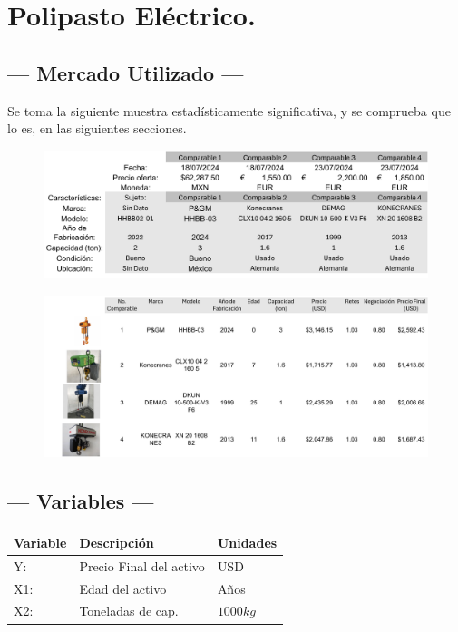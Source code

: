 
\section{Polipasto Eléctrico.} %

\subsection{\centering --- Mercado Utilizado ---} %
Se toma la siguiente muestra estadísticamente significativa, y se 
comprueba que lo es, en las siguientes secciones.
\begin{figure}[hbtp!]
	\centering
\includegraphics[width=  0.7\linewidth, page = 1]{../0.imagenes/CAP_8/mercado_2_1}
\end{figure}
\begin{figure}[hbtp!]
	\centering
\includegraphics[width=  \linewidth, page = 1]{../0.imagenes/CAP_8/mercado_2_2}
\end{figure}

\subsection{\centering --- Variables ---} %
\begin{center}
  \begin{tabular}{|l|l|l|}
    \hline 
    Variable & Descripción   & Unidades\\ \hline 
    Y:  & Precio Final del activo  & USD \\ \hline 
    X1: & Edad del activo    & Años \\ \hline 
		X2: & Toneladas de cap.  & \(1000kg\) \\ \hline 
  \end{tabular}
\end{center} 

